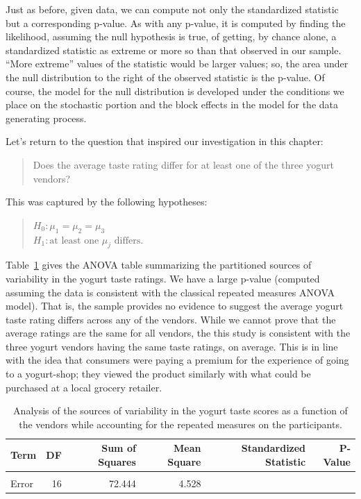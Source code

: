 \documentclass[
  letterpaper,
  DIV=11,
  numbers=noendperiod]{scrreprt}
\theoremstyle{definition}
\theoremstyle{definition}
\theoremstyle{plain}
\theoremstyle{remark}
\begin{document}
Just as before, given data, we can compute not only the standardized
statistic but a corresponding p-value. As with any p-value, it is
computed by finding the likelihood, assuming the null hypothesis is
true, of getting, by chance alone, a standardized statistic as extreme
or more so than that observed in our sample. ``More extreme'' values of
the statistic would be larger values; so, the area under the null
distribution to the right of the observed statistic is the p-value. Of
course, the model for the null distribution is developed under the
conditions we place on the stochastic portion and the block effects in
the model for the data generating process.

Let's return to the question that inspired our investigation in this
chapter:

\begin{quote}
Does the average taste rating differ for at least one of the three
yogurt vendors?
\end{quote}

This was captured by the following hypotheses:

\begin{quote}
\(H_0: \mu_1 = \mu_2 = \mu_3\)\\
\(H_1: \text{at least one } \mu_j \text{ differs}.\)
\end{quote}

Table~\ref{tbl-blockteststat-anova} gives the ANOVA table summarizing
the partitioned sources of variability in the yogurt taste ratings. We
have a large p-value (computed assuming the data is consistent with the
classical repeated measures ANOVA model). That is, the sample provides
no evidence to suggest the average yogurt taste rating differs across
any of the vendors. While we cannot prove that the average ratings are
the same for all vendors, the this study is consistent with the three
yogurt vendors having the same taste ratings, on average. This is in
line with the idea that consumers were paying a premium for the
experience of going to a yogurt-shop; they viewed the product similarly
with what could be purchased at a local grocery retailer.

\hypertarget{tbl-blockteststat-anova}{}
\begin{table}
\caption{\label{tbl-blockteststat-anova}Analysis of the sources of variability in the yogurt taste scores as a
function of the vendors while accounting for the repeated measures on
the participants. }\tabularnewline

\centering
\begin{tabular}[t]{lrrrrr}
\toprule
Term & DF & Sum of Squares & Mean Square & Standardized Statistic & P-Value\\
\midrule
\cellcolor{gray!6}{Vendor} & \cellcolor{gray!6}{2} & \cellcolor{gray!6}{2.889} & \cellcolor{gray!6}{1.444} & \cellcolor{gray!6}{0.319} & \cellcolor{gray!6}{0.731}\\
Error & 16 & 72.444 & 4.528 &  & \\
\bottomrule
\end{tabular}
\end{table}
\end{document}
